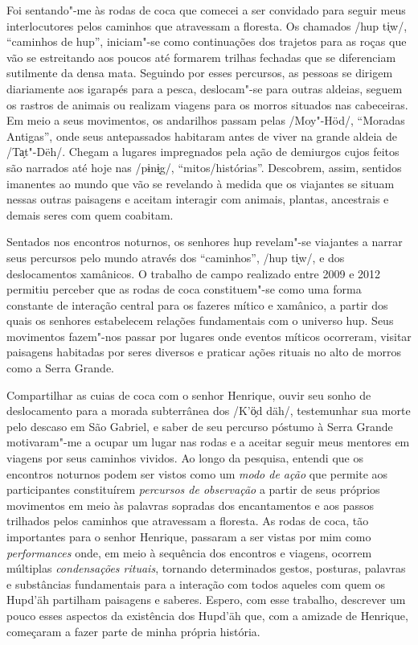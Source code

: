 Foi sentando"-me às rodas de coca que comecei a ser convidado para seguir
meus interlocutores pelos caminhos que atravessam a floresta. Os
chamados /hup ti̖w/, ``caminhos de hup'', iniciam"-se como continuações
dos trajetos para as roças que vão se estreitando aos poucos até
formarem trilhas fechadas que se diferenciam sutilmente da densa mata.
Seguindo por esses percursos, as pessoas se dirigem diariamente aos
igarapés para a pesca, deslocam"-se para outras aldeias, seguem os
rastros de animais ou realizam viagens para os morros situados nas
cabeceiras. Em meio a seus movimentos, os andarilhos passam pelas
/Moy"-Höd/, ``Moradas Antigas'', onde seus antepassados habitaram antes
de viver na grande aldeia de /Ta̗t"-Dëh/. Chegam a lugares impregnados
pela ação de demiurgos cujos feitos são narrados até hoje nas /pɨnɨ̖g/,
``mitos/histórias''. Descobrem, assim, sentidos imanentes ao mundo que
vão se revelando à medida que os viajantes se situam nessas outras
paisagens e aceitam interagir com animais, plantas, ancestrais e demais
seres com quem coabitam.

Sentados nos encontros noturnos, os senhores hup revelam"-se viajantes a
narrar seus percursos pelo mundo através dos ``caminhos'', /hup ti̖w/, e
dos deslocamentos xamânicos. O trabalho de campo realizado entre 2009 e
2012 permitiu perceber que as rodas de coca constituem"-se como uma forma
constante de interação central para os fazeres mítico e xamânico, a
partir dos quais os senhores estabelecem relações fundamentais com o
universo hup. Seus movimentos fazem"-nos passar por lugares onde eventos
míticos ocorreram, visitar paisagens habitadas por seres diversos e
praticar ações rituais no alto de morros como a Serra Grande.

Compartilhar as cuias de coca com o senhor Henrique, ouvir seu sonho de
deslocamento para a morada subterrânea dos /K'ö̗d däh/, testemunhar sua
morte pelo descaso em São Gabriel, e saber de seu percurso póstumo à
Serra Grande motivaram"-me a ocupar um lugar nas rodas e a aceitar seguir
meus mentores em viagens por seus caminhos vividos. Ao longo da
pesquisa, entendi que os encontros noturnos podem ser vistos como um
\textit{modo de ação} que permite aos participantes constituírem
\textit{percursos de observação} a partir de seus próprios movimentos em
meio às palavras sopradas dos encantamentos e aos passos trilhados pelos
caminhos que atravessam a floresta. As rodas de coca, tão importantes
para o senhor Henrique, passaram a ser vistas por mim como
\textit{performances} onde, em meio à sequência dos encontros e viagens,
ocorrem múltiplas \textit{condensações rituais}, tornando determinados
gestos, posturas, palavras e substâncias fundamentais para a interação
com todos aqueles com quem os Hupd'äh partilham paisagens e saberes.
Espero, com esse trabalho, descrever um pouco esses aspectos da
existência dos Hupd'äh que, com a amizade de Henrique, começaram a fazer
parte de minha própria história.

